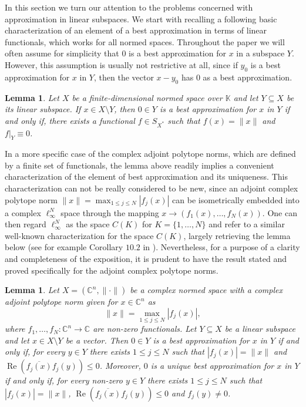 \documentclass[12pt, reqno]{amsart}
\newtheorem{lem}[twr]{Lemma}
\theoremstyle{definition}
\theoremstyle{remark}
\numberwithin{equation}{section}
\DeclareMathOperator{\re}{Re}
\begin{document}
In this section we turn our attention to the problems concerned with approximation in linear subspaces. We start with recalling a following basic characterization of an element of a best approximation in terms of linear functionals, which works for all normed spaces. Throughout the paper we will often assume for simplicity that $0$ is a best approximation for $x$ in a subspace $Y$. However, this assumption is usually not restrictive at all, since if $y_0$ is a best approximation for $x$ in $Y$, then the vector $x-y_0$ has $0$ as a best approximation.


\begin{lem}
\label{lemfunkcjonal}
Let $X$ be a finite-dimensional normed space over $\mathbb{K}$ and let $Y \subseteq X$ be its linear subspace. If $x \in X \setminus Y$, then $0 \in Y$ is a best approximation for $x$ in $Y$ if and only if, there exists a functional $f \in S_{X^*}$ such that $f(x)=\|x\|$ and $f|_{Y} \equiv 0$. 
\end{lem}

In a more specific case of the complex adjoint polytope norms, which are defined by a finite set of functionals, the lemma above readily implies a convenient characterization of the element of best approximation and its uniqueness. This characterization can not be really considered to be new, since an adjoint complex polytope norm $\|x\|=\max_{1 \leq j \leq N} |f_j(x)|$ can be isometrically embedded into a complex $\ell_{\infty}^N$ space through the mapping $x \to (f_1(x), \ldots, f_N(x))$. One can then regard $\ell_{\infty}^N$ as the space $C(K)$ for $K=\{1, \ldots, N\}$ and refer to a similar well-known characterization for the space $C(K)$, largely retrieving the lemma below (see for example Corollary $10.2$ in \cite{survey}). Nevertheless, for a purpose of a clarity and completeness of the exposition, it is prudent to have the result stated and proved specifically for the adjoint complex polytope norms.

\begin{lem}
\label{charadjoint}
Let $X=(\mathbb{C}^n, \| \cdot \|)$ be a complex normed space with a complex adjoint polytope norm given for $x \in \mathbb{C}^n$ as
$$\|x\| = \max_{1 \leq j \leq N} |f_j(x)|,$$
where $f_1, \ldots, f_N: \mathbb{C}^n \to \mathbb{C}$ are non-zero functionals. Let $Y \subseteq X$ be a linear subspace and let $x \in X \setminus Y$ be a vector. Then $0 \in Y$ is a best approximation for $x$ in $Y$ if and only if, for every $y \in Y$ there exists $1 \leq j \leq N$ such that $|f_j(x)|=\|x\|$ and $\re \left (\overline{f_j(x)}f_j(y) \right ) \leq 0$. Moreover, $0$ is a unique best approximation for $x$ in $Y$ if and only if, for every non-zero $y \in Y$ there exists $1 \leq j \leq N$ such that $|f_j(x)|=\|x\|$, $\re \left ( \overline{f_j(x)}f_j(y) \right ) \leq 0$ and $f_j(y) \neq 0$.
\end{lem}
\end{document}
